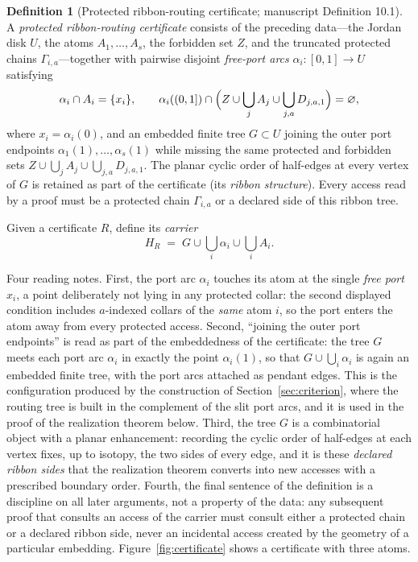 \documentclass[11pt,reqno]{amsart}
\theoremstyle{definition}
\newtheorem{definition}[theorem]{Definition}
\theoremstyle{remark}
\begin{document}
\begin{definition}[Protected ribbon-routing certificate; manuscript
Definition 10.1]\label{def:certificate}
A \emph{protected ribbon-routing certificate} consists of the preceding
data---the Jordan disk $U$, the atoms $A_1,\dots,A_s$, the forbidden set
$Z$, and the truncated protected chains $\Gamma_{i,a}$---together with
pairwise disjoint \emph{free-port arcs} $\alpha_i\colon[0,1]\to U$
satisfying
\[
\alpha_i\cap A_i=\{x_i\},\qquad
\alpha_i((0,1])\cap
\Bigl(Z\cup\bigcup_{j}A_j\cup\bigcup_{j,a}D_{j,a,1}\Bigr)=\varnothing,
\]
where $x_i=\alpha_i(0)$, and an embedded finite tree $G\subset U$ joining
the outer port endpoints $\alpha_1(1),\dots,\alpha_s(1)$ while missing the
same protected and forbidden sets
$Z\cup\bigcup_jA_j\cup\bigcup_{j,a}D_{j,a,1}$.  The planar cyclic order of
half-edges at every vertex of $G$ is retained as part of the certificate
(its \emph{ribbon structure}).  Every access read by a proof must be a
protected chain $\Gamma_{i,a}$ or a declared side of this ribbon tree.
\end{definition}

Given a certificate $R$, define its \emph{carrier}
\begin{equation}\label{eq:C-HR}
H_R \;=\; G\cup\bigcup_i\alpha_i\cup\bigcup_iA_i .
\end{equation}

Four reading notes.  First, the port arc $\alpha_i$ touches its atom at
the single \emph{free port} $x_i$, a point deliberately not lying in any
protected collar: the second displayed condition includes
$a$-indexed collars of the \emph{same} atom $i$, so the port enters the
atom away from every protected access.  Second, ``joining the outer port
endpoints'' is read as part of the embeddedness of the certificate: the
tree $G$ meets each port arc $\alpha_i$ in exactly the point
$\alpha_i(1)$, so that $G\cup\bigcup_i\alpha_i$ is again an embedded
finite tree, with the port arcs attached as pendant edges.  This is the
configuration produced by the construction of
Section~\ref{sec:criterion}, where the routing tree is built in the
complement of the slit port arcs, and it is used in the proof of the
realization theorem below.  Third, the tree $G$ is a
combinatorial object with a planar enhancement: recording the cyclic order
of half-edges at each vertex fixes, up to isotopy, the two sides of every
edge, and it is these \emph{declared ribbon sides} that the realization
theorem converts into new accesses with a prescribed boundary order.
Fourth, the final sentence of the definition is a discipline on all later
arguments, not a property of the data: any subsequent proof that consults
an access of the carrier must consult either a protected chain or a
declared ribbon side, never an incidental access created by the geometry
of a particular embedding.  Figure~\ref{fig:certificate} shows a
certificate with three atoms.
\end{document}

